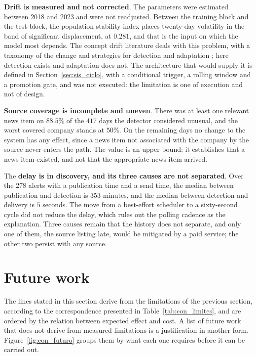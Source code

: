 \textbf{Drift is measured and not corrected}. The parameters were estimated between 2018 and 2023
and were not readjusted. Between the training block and the test block, the population stability
index places twenty-day volatility in the band of significant displacement, at $0.281$, and that is
the input on which the model most depends. The concept drift literature deals with this problem,
with a taxonomy of the change and strategies for detection and adaptation
\autocite{gama2014survey}; here detection exists and adaptation does not. The architecture that
would supply it is defined in Section~\ref{sec:sis_ciclo}, with a conditional trigger, a rolling
window and a promotion gate, and was not executed: the limitation is one of execution and not of
design.

\textbf{Source coverage is incomplete and uneven}. There was at least one relevant news item on
$88.5\%$ of the $417$ days the detector considered unusual, and the worst covered company stands at
$50\%$. On the remaining days no change to the system has any effect, since a news item not
associated with the company by the source never enters the path. The value is an upper bound: it
establishes that a news item existed, and not that the appropriate news item arrived.

The \textbf{delay is in discovery, and its three causes are not separated}. Over the $278$ alerts
with a publication time and a send time, the median between publication and detection is $353$
minutes, and the median between detection and delivery is $5$ seconds. The move from a best-effort
scheduler to a sixty-second cycle did not reduce the delay, which rules out the polling cadence as
the explanation. Three causes remain that the history does not separate, and only one of them, the
source listing late, would be mitigated by a paid service; the other two persist with any
source.

\section{Future work}
\label{sec:con_futuro}

The lines stated in this section derive from the limitations of the previous section, according to
the correspondence presented in Table~\ref{tab:con_limites}, and are ordered by the relation
between expected effect and cost. A list of future work that does not derive from measured
limitations is a justification in another form. Figure~\ref{fig:con_futuro} groups them by what
each one requires before it can be carried out.

